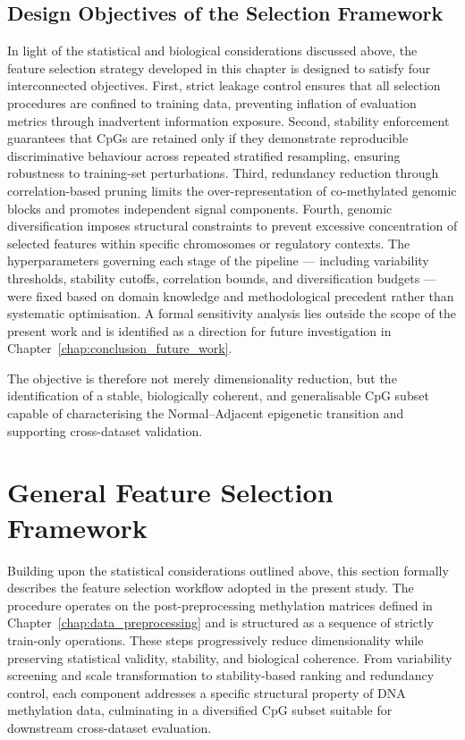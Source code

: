 \subsection{Design Objectives of the Selection Framework}
\label{sec:fs_stability}

In light of the statistical and biological considerations discussed above,
the feature selection strategy developed in this chapter is designed to
satisfy four interconnected objectives. First, strict leakage control
ensures that all selection procedures are confined to training data,
preventing inflation of evaluation metrics through inadvertent information
exposure. Second, stability enforcement guarantees that CpGs are retained
only if they demonstrate reproducible discriminative behaviour across
repeated stratified resampling, ensuring robustness to training-set
perturbations. Third, redundancy reduction through correlation-based
pruning limits the over-representation of co-methylated genomic blocks
and promotes independent signal components. Fourth, genomic diversification
imposes structural constraints to prevent excessive concentration of
selected features within specific chromosomes or regulatory contexts.
The hyperparameters governing each stage of the pipeline — including
variability thresholds, stability cutoffs, correlation bounds, and
diversification budgets — were fixed based on domain knowledge and
methodological precedent rather than systematic optimisation. A formal
sensitivity analysis lies outside the scope of the present work and is
identified as a direction for future investigation in
Chapter~\ref{chap:conclusion_future_work}.

The objective is therefore not merely dimensionality reduction, but the
identification of a stable, biologically coherent, and generalisable CpG
subset capable of characterising the Normal--Adjacent epigenetic transition
and supporting cross-dataset validation.

\section{General Feature Selection Framework}
\label{sec:fs_framework}

Building upon the statistical considerations outlined above, this section 
formally describes the feature selection workflow adopted in the present 
study. The procedure operates on the post-preprocessing methylation 
matrices defined in Chapter~\ref{chap:data_preprocessing} and is structured 
as a sequence of strictly train-only operations. These steps progressively 
reduce dimensionality while preserving statistical validity, stability, 
and biological coherence. From variability screening and scale 
transformation to stability-based ranking and redundancy control, 
each component addresses a specific structural property of DNA 
methylation data, culminating in a diversified CpG subset suitable 
for downstream cross-dataset evaluation.
